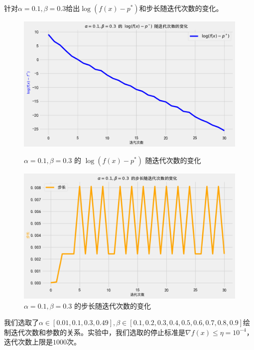 \documentclass{homework}
\begin{document}
\begin{sol}
    针对$\alpha = 0.1, \beta = 0.3$给出$\log(f(x)-p^*)$和步长随迭代次数的变化。    
\begin{figure}[h]
    \centering
    \begin{minipage}[t]{0.48\textwidth}
        \centering
        \includegraphics[width=\linewidth]{3-1.png}
        \caption{$\alpha=0.1, \beta=0.3$ 的 $\log(f(x) - p^*)$ 随迭代次数的变化}
    \end{minipage}
    \hfill %
    \begin{minipage}[t]{0.48\textwidth}
        \centering
        \includegraphics[width=\linewidth]{3-2.png}
        \caption{$\alpha=0.1, \beta=0.3$ 的步长随迭代次数的变化}
    \end{minipage}
\end{figure}


我们选取了$\alpha\in [0.01, 0.1, 0.3, 0.49], \beta\in[0.1, 0.2, 0.3, 0.4, 0.5, 0.6, 0.7, 0.8, 0.9]$绘制迭代次数和参数的关系。实验中，我们选取的停止标准是$\nabla f(x) \le \eta = 10^{-4}$，迭代次数上限是$1000$次。


\end{sol}
\end{document}
